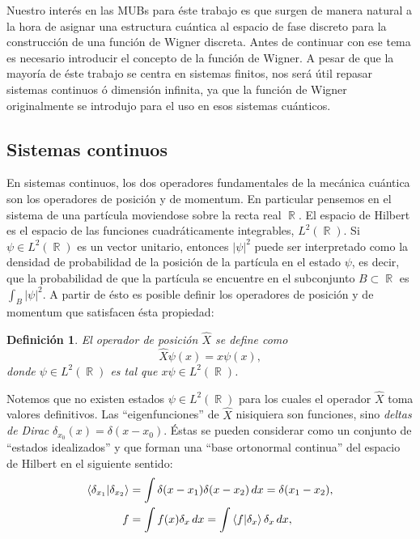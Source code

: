 \documentclass[a4paper,11pt]{report}
\DeclareMathOperator{\R}{\mathbb{R}}
\newtheorem{definition}{Definición}
\begin{document}
  Nuestro interés en las MUBs para éste trabajo es que
  surgen de manera natural a la hora de asignar una
  estructura cuántica al espacio de fase discreto para la
  construcción de una función de Wigner discreta. Antes de
  continuar con ese tema es necesario introducir el concepto
  de la función de Wigner. A pesar de que la mayoría de éste
  trabajo se centra en sistemas finitos, nos será útil
  repasar sistemas continuos ó dimensión infinita, ya que la
  función de Wigner originalmente se introdujo para el uso
  en esos sistemas cuánticos.

  \subsection{Sistemas continuos}

  En sistemas continuos, los dos operadores fundamentales de
  la mecánica cuántica son los operadores de posición y de
  momentum. En particular pensemos en el sistema de una
  partícula moviendose sobre la recta real $\R$. El espacio
  de Hilbert es el espacio de las funciones cuadráticamente
  integrables, $L^2(\R)$. Si $\psi \in L^2(\R)$ es un vector
  unitario, entonces $|\psi|^2$ puede ser interpretado como
  la densidad de probabilidad de la posición de la partícula
  en el estado $\psi$, es decir, que la probabilidad de que
  la partícula se encuentre en el subconjunto $B \subset \R$
  es $\int_B |\psi|^2$. A partir de ésto es posible definir
  los operadores de posición y de momentum que satisfacen
  ésta propiedad:
  \begin{definition}
    El operador de posición $\hat X$ se define como
    \[
      \hat X\psi(x) = x\psi(x),
    \] 
    donde $\psi \in L^2(\R)$ es tal que $x\psi \in L^2(\R)$.
  \end{definition}
  Notemos que no existen estados $\psi \in L^2(\R)$ para los
  cuales el operador $\hat X$ toma valores definitivos. Las
  ``eigenfunciones'' de $\hat X$ nisiquiera son funciones,
  sino \textit{deltas de Dirac} $\delta_{x_0}(x) = \delta(x
  - x_0)$. Éstas se pueden considerar como un conjunto de
  ``estados idealizados'' y que forman una ``base ortonormal
  continua'' del espacio de Hilbert en el siguiente sentido:
  \begin{align*}
    \braket{\delta_{x_1}|\delta_{x_2}}
    &= \int \delta(x-x_1)\delta(x-x_2) \, dx
    = \delta(x_1-x_2), \\
    f
    &= \int f(x)\delta_x \, dx
    = \int \braket{f| \delta_x}\delta_x \, dx,
  \end{align*} 
\end{document}
